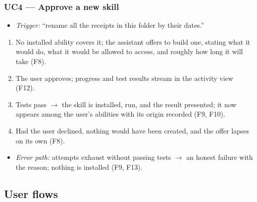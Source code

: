 \documentclass[12pt]{article}
\begin{document}
\subsubsection{UC4 --- Approve a new skill}\label{sec:uc4}

\begin{itemize}[itemsep=1pt]
  \item \emph{Trigger:} ``rename all the receipts in this folder by their
    dates.''
\end{itemize}

\begin{enumerate}[itemsep=1pt]
  \item No installed ability covers it; the assistant offers to build one,
    stating what it would do, what it would be allowed to access, and
    roughly how long it will take (F8).
  \item The user approves; progress and test results stream in the activity
    view (F12).
  \item Tests pass $\rightarrow$ the skill is installed, run, and the result
    presented; it now appears among the user's abilities with its origin
    recorded (F9, F10).
  \item Had the user declined, nothing would have been created, and the
    offer lapses on its own (F8).
\end{enumerate}

\begin{itemize}[itemsep=1pt]
  \item \emph{Error path:} attempts exhaust without passing tests
    $\rightarrow$ an honest failure with the reason; nothing is installed
    (F9, F13).
\end{itemize}

\subsection{User flows}\label{sec:user-flows}
\end{document}

